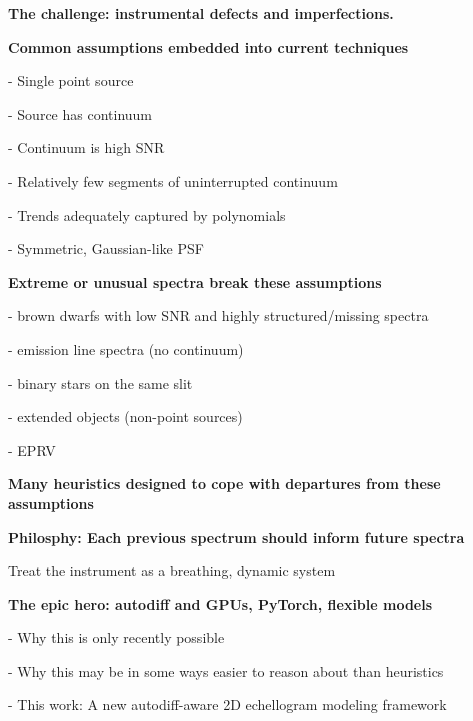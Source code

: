 \documentclass[twocolumn]{aastex63}
\begin{document}
\textbf{The challenge: instrumental defects and imperfections.}


\begin{mdframed}
  \textbf{Common assumptions embedded into current techniques} \par
  - Single point source\par
  - Source has continuum\par
  - Continuum is high SNR\par
  - Relatively few segments of uninterrupted continuum\par
  - Trends adequately captured by polynomials\par
  - Symmetric, Gaussian-like PSF\par
\end{mdframed}

\begin{mdframed}
  \textbf{Extreme or unusual spectra break these assumptions} \par
  - brown dwarfs with low SNR and highly structured/missing spectra\par
  - emission line spectra (no continuum)\par
  - binary stars on the same slit\par
  - extended objects (non-point sources)\par
  - EPRV\par
\end{mdframed}

\begin{mdframed}
  \textbf{Many heuristics designed to cope with departures from these assumptions} \par
  \textcolor{lightgray}{\lipsum[4]}
\end{mdframed}

\begin{mdframed}
  \textbf{Philosphy: Each previous spectrum should inform future spectra} \par
  Treat the instrument as a breathing, dynamic system\par
  \textcolor{lightgray}{\lipsum[5]}
\end{mdframed}

\begin{mdframed}
  \textbf{The epic hero: autodiff and GPUs, PyTorch, flexible models} \par
  - Why this is only recently possible\par
  - Why this may be in some ways easier to reason about than heuristics\par
  - This work: A new autodiff-aware 2D echellogram modeling framework\par
  \textcolor{lightgray}{\lipsum[6]}
\end{mdframed}
\end{document}
